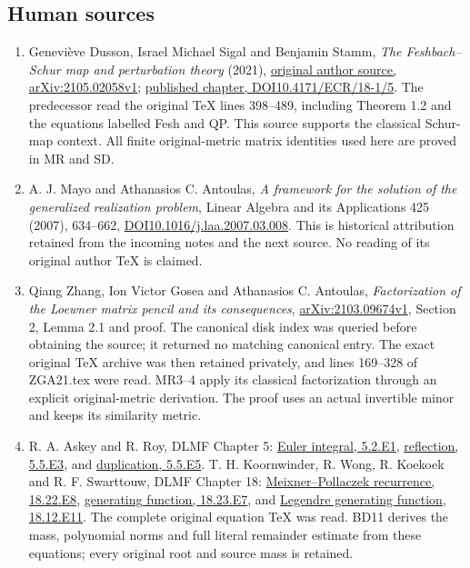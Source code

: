 \documentclass[11pt]{article}
\begin{document}
\subsection{Human sources}\label{human-sources}

\begin{enumerate}
\def\labelenumi{\arabic{enumi}.}
\tightlist
\item
  Geneviève Dusson, Israel Michael Sigal and Benjamin Stamm, \emph{The Feshbach--Schur map and perturbation theory} (2021), \href{https://arxiv.org/abs/2105.02058v1}{original author source, arXiv:2105.02058v1}; \href{https://doi.org/10.4171/ECR/18-1/5}{published chapter, DOI10.4171/ECR/18-1/5}. The predecessor read the original TeX lines 398--489, including Theorem 1.2 and the equations labelled Fesh and QP. This source supports the classical Schur-map context. All finite original-metric matrix identities used here are proved in MR and SD.
\item
  A. J. Mayo and Athanasios C. Antoulas, \emph{A framework for the solution of the generalized realization problem}, Linear Algebra and its Applications 425 (2007), 634--662, \href{https://doi.org/10.1016/j.laa.2007.03.008}{DOI10.1016/j.laa.2007.03.008}. This is historical attribution retained from the incoming notes and the next source. No reading of its original author TeX is claimed.
\item
  Qiang Zhang, Ion Victor Gosea and Athanasios C. Antoulas, \emph{Factorization of the Loewner matrix pencil and its consequences}, \href{https://arxiv.org/abs/2103.09674v1}{arXiv:2103.09674v1}, Section 2, Lemma 2.1 and proof. The canonical disk index was queried before obtaining the source; it returned no matching canonical entry. The exact original TeX archive was then retained privately, and lines 169--328 of ZGA21.tex were read. MR3--4 apply its classical factorization through an explicit original-metric derivation. The proof uses an actual invertible minor and keeps its similarity metric.
\item
  R. A. Askey and R. Roy, DLMF Chapter 5: \href{https://dlmf.nist.gov/5.2.E1.tex}{Euler integral, 5.2.E1}, \href{https://dlmf.nist.gov/5.5.E3.tex}{reflection, 5.5.E3}, and \href{https://dlmf.nist.gov/5.5.E5.tex}{duplication, 5.5.E5}. T. H. Koornwinder, R. Wong, R. Koekoek and R. F. Swarttouw, DLMF Chapter 18: \href{https://dlmf.nist.gov/18.22.E8.tex}{Meixner--Pollaczek recurrence, 18.22.E8}, \href{https://dlmf.nist.gov/18.23.E7.tex}{generating function, 18.23.E7}, and \href{https://dlmf.nist.gov/18.12.E11.tex}{Legendre generating function, 18.12.E11}. The complete original equation TeX was read. BD11 derives the mass, polynomial norms and full literal remainder estimate from these equations; every original root and source mass is retained.

\end{enumerate}
\end{document}
